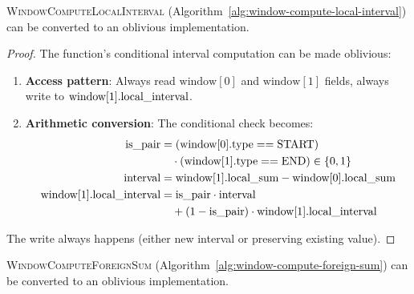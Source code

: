 \begin{lemma}
\label{lem:window-local-interval}
\textsc{WindowComputeLocalInterval} (Algorithm~\ref{alg:window-compute-local-interval}) can be converted to an oblivious implementation.
\end{lemma}

\begin{proof}
The function's conditional interval computation can be made oblivious:
\begin{enumerate}
\item \textbf{Access pattern}: Always read $\text{window}[0]$ and $\text{window}[1]$ fields, always write to $\text{window}[1].\text{local\_interval}$.
\item \textbf{Arithmetic conversion}: The conditional check becomes:
\begin{align}
\text{is\_pair} &= (\text{window}[0].\text{type} == \text{START}) \nonumber \\
&\quad \cdot (\text{window}[1].\text{type} == \text{END}) \in \{0,1\} \nonumber \\
\text{interval} &= \text{window}[1].\text{local\_sum} - \text{window}[0].\text{local\_sum} \nonumber \\
\text{window}[1].\text{local\_interval} &= \text{is\_pair} \cdot \text{interval} \nonumber \\
&\quad + (1 - \text{is\_pair}) \cdot \text{window}[1].\text{local\_interval} \nonumber
\end{align}
\end{enumerate}
The write always happens (either new interval or preserving existing value).
\end{proof}

\begin{lemma}
\label{lem:window-foreign-sum}
\textsc{WindowComputeForeignSum} (Algorithm~\ref{alg:window-compute-foreign-sum}) can be converted to an oblivious implementation.
\end{lemma}

